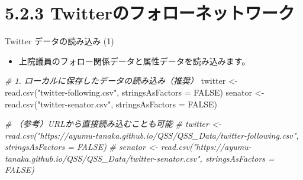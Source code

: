 \documentclass[
  ignorenonframetext,
]{beamer}
\newenvironment{Shaded}{\begin{snugshade}}{\end{snugshade}}
\newcommand{\AttributeTok}[1]{\textcolor[rgb]{0.77,0.63,0.00}{#1}}
\newcommand{\CommentTok}[1]{\textcolor[rgb]{0.56,0.35,0.01}{\textit{#1}}}
\newcommand{\ConstantTok}[1]{\textcolor[rgb]{0.00,0.00,0.00}{#1}}
\newcommand{\FunctionTok}[1]{\textcolor[rgb]{0.00,0.00,0.00}{#1}}
\newcommand{\NormalTok}[1]{#1}
\newcommand{\OtherTok}[1]{\textcolor[rgb]{0.56,0.35,0.01}{#1}}
\newcommand{\StringTok}[1]{\textcolor[rgb]{0.31,0.60,0.02}{#1}}
\providecommand{\tightlist}{%
  \setlength{\itemsep}{0pt}\setlength{\parskip}{0pt}}
\begin{document}
\hypertarget{twitterux306eux30d5ux30a9ux30edux30fcux30cdux30c3ux30c8ux30efux30fcux30af}{%
\section{5.2.3
Twitterのフォローネットワーク}\label{twitterux306eux30d5ux30a9ux30edux30fcux30cdux30c3ux30c8ux30efux30fcux30af}}

\begin{frame}[fragile]{Twitter データの読み込み (1)}
\protect\hypertarget{twitter-ux30c7ux30fcux30bfux306eux8aadux307fux8fbcux307f-1}{}
\begin{itemize}
\tightlist
\item
  上院議員のフォロー関係データと属性データを読み込みます。
\end{itemize}

\scriptsize

\begin{Shaded}
\begin{Highlighting}[]
\CommentTok{\# 1. ローカルに保存したデータの読み込み（推奨）}
\NormalTok{twitter }\OtherTok{\textless{}{-}} \FunctionTok{read.csv}\NormalTok{(}\StringTok{"twitter{-}following.csv"}\NormalTok{, }\AttributeTok{stringsAsFactors =} \ConstantTok{FALSE}\NormalTok{)}
\NormalTok{senator }\OtherTok{\textless{}{-}} \FunctionTok{read.csv}\NormalTok{(}\StringTok{"twitter{-}senator.csv"}\NormalTok{, }\AttributeTok{stringsAsFactors =} \ConstantTok{FALSE}\NormalTok{)}

\CommentTok{\# （参考）URLから直接読み込むことも可能}
\CommentTok{\# twitter \textless{}{-} read.csv("https://ayumu{-}tanaka.github.io/QSS/QSS\_Data/twitter{-}following.csv", stringsAsFactors = FALSE)}
\CommentTok{\# senator \textless{}{-} read.csv("https://ayumu{-}tanaka.github.io/QSS/QSS\_Data/twitter{-}senator.csv", stringsAsFactors = FALSE)}
\end{Highlighting}
\end{Shaded}

\normalsize
\end{frame}
\end{document}
